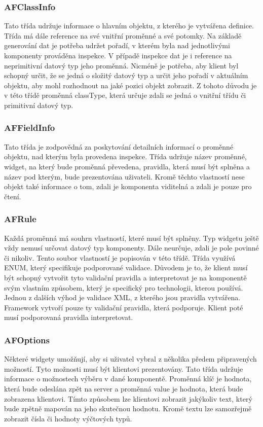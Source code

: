 \subsubsection{AFClassInfo}
Tato třída udržuje informace o hlavním objektu, z kterého je vytvářena definice. Třída má dále reference na své vnitřní proměnné a své potomky. Na základě generování dat je potřeba udržet pořadí, v kterém byla nad jednotlivými komponenty prováděna inspekce. V případě inspekce dat je i reference na neprimitivní datový typ jeho proměnná. Nicméně je potřeba, aby klient byl schopný určit, že se jedná o složitý datový typ a určit jeho pořadí v aktuálním objektu, aby mohl rozhodnout na jaké pozici objekt zobrazit. Z tohoto důvodu je v této třídě proměnná classType, která určuje zdali se jedná o vnitřní třídu či primitivní datový typ.
\subsubsection{AFFieldInfo}
Tato třída je zodpovědná za poskytování detailních informací o proměnné objektu, nad kterým byla provedena inspekce. Třída udržuje název proměnné, widget, na který bude proměnná převedena, pravidla, která musí být splněna a název pod kterým, bude prezentována uživateli. Kromě těchto vlastností nese objekt také informace o tom, zdali je komponenta viditelná a zdali je pouze pro čtení.
\subsubsection{AFRule}
Každá proměnná má souhrn vlastností, které musí být splněny. Typ widgetu ještě vždy nemusí určovat datový typ komponenty. Dále neurčuje, zdali je pole povinné či nikoliv. Tento soubor vlastností je popisován v této třídě. Třída využívá ENUM, který specifikuje podporované validace. Důvodem je to, že klient musí být schopný vytvořit tyto validační pravidla a interpretovat je na komponentě svým vlastním způsobem, který je specifický pro technologii, kterou používá. Jednou z dalších výhod je validace XML, z kterého jsou pravidla vytvářena. Framework vytvoří pouze ty validační pravidla, která podporuje. Klient poté musí podporovaná pravidla interpretovat. 
\subsubsection{AFOptions}
Některé widgety umožňují, aby si uživatel vybral z několika předem připravených možností. Tyto možnosti musí být klientovi prezentovány. Tato třída udržuje informace o možnostech výběru v dané komponentě. Proměnná klíč je hodnota, která bude odeslána zpět na server a proměnná value je hodnota, která bude zobrazena klientovi. Tímto způsobem lze klientovi zobrazit jakýkoliv text, který bude zpětně mapován na jeho skutečnou hodnotu. Kromě textu lze samozřejmě zobrazit čísla či hodnoty výčtových typů.

